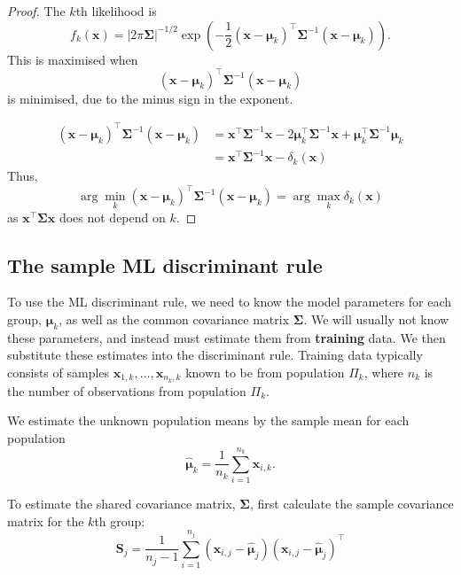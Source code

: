 \documentclass[
]{book}
\theoremstyle{definition}
\theoremstyle{definition}
\theoremstyle{definition}
\theoremstyle{definition}
\theoremstyle{remark}
\begin{document}
\begin{proof}
The \(k\)th likelihood is
\begin{equation}
f_k(\mathbf x) = | 2 \pi \boldsymbol{\Sigma}|^{-1/2} \exp \left(-\frac{1}{2} (\mathbf x- {\boldsymbol{\mu}}_k)^\top \boldsymbol{\Sigma}^{-1} (\mathbf x- {\boldsymbol{\mu}}_k) \right).\label{eq:mvnlike}
\end{equation}
This is maximised when \[(\mathbf x- {\boldsymbol{\mu}}_k)^\top \boldsymbol{\Sigma}^{-1} (\mathbf x- {\boldsymbol{\mu}}_k)\] is minimised, due to the minus sign in the exponent.

\begin{align*}
(\mathbf x-{\boldsymbol{\mu}}_k)^\top \boldsymbol{\Sigma}^{-1} (\mathbf x-{\boldsymbol{\mu}}_k) &= \mathbf x^\top \boldsymbol{\Sigma}^{-1}\mathbf x
-2{\boldsymbol{\mu}}_k^\top \boldsymbol{\Sigma}^{-1}\mathbf x+{\boldsymbol{\mu}}_k^\top \boldsymbol{\Sigma}^{-1}{\boldsymbol{\mu}}_k\\
&= \mathbf x^\top \boldsymbol{\Sigma}^{-1}\mathbf x-\delta_k(\mathbf x)
\end{align*}
Thus,
\[\arg \min_k (\mathbf x-{\boldsymbol{\mu}}_k)^\top \boldsymbol{\Sigma}^{-1} (\mathbf x-{\boldsymbol{\mu}}_k) = \arg\max_k \delta_k(\mathbf x)\]
as \(\mathbf x^\top \boldsymbol{\Sigma}\mathbf x\) does not depend on \(k\).
\end{proof}

\subsection{The sample ML discriminant rule}\label{sample-lda}

To use the ML discriminant rule, we need to know the model parameters for each group, \({\boldsymbol{\mu}}_k\), as well as the common covariance matrix \(\boldsymbol{\Sigma}\). We will usually not know these parameters, and instead must estimate them from \textbf{training} data. We then substitute these estimates into the discriminant rule. Training data typically consists of samples \(\mathbf x_{1,k}, \ldots, \mathbf x_{n_k,k}\) known to be from population \(\Pi_k\), where \(n_k\) is the number of observations from population \(\Pi_k\).

We estimate the unknown population means by the sample mean for each population
\[\hat{{\boldsymbol{\mu}}}_k =\frac{1}{n_k} \sum_{i=1}^{n_k} \mathbf x_{i,k}.\]

To estimate the shared covariance matrix, \(\boldsymbol{\Sigma}\), first calculate the sample covariance matrix for the \(k\)th group:
\[\mathbf S_j=\frac{1}{n_j-1}\sum_{i=1}^{n_j} (\mathbf x_{i,j}-\hat{{\boldsymbol{\mu}}}_j)(\mathbf x_{i,j}-\hat{{\boldsymbol{\mu}}}_j)^\top\]
\end{document}
